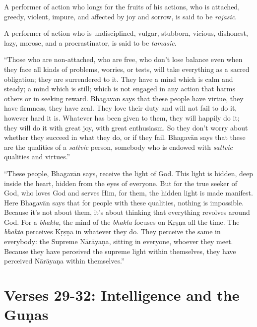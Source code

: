 {A performer of action who longs for the fruits of his actions, who is attached, greedy, violent, impure, and affected by joy and sorrow, is said to be \textit{rajasic}.}

{A performer of action who is undisciplined, vulgar, stubborn, vicious, dishonest, lazy, morose, and a procrastinator, is said to be \textit{tamasic}.}

\enquote{Those who are non-attached, who are free, who don’t lose balance even when they face all kinds of problems, worries, or tests, will take everything as a sacred obligation; they are surrendered to it. They have a mind which is calm and steady; a mind which is still; which is not engaged in any action that harms others or in seeking reward. Bhagavān says that these people have virtue, they have firmness, they have zeal. They love their duty and will not fail to do it, however hard it is. Whatever has been given to them, they will happily do it; they will do it with great joy, with great enthusiasm. So they don’t worry about whether they succeed in what they do, or if they fail. Bhagavān says that these are the qualities of a \textit{sattvic} person, somebody who is endowed with \textit{sattvic} qualities and virtues.}

\enquote{These people, Bhagavān says, receive the light of God. This light is hidden, deep inside the heart, hidden from the eyes of everyone. But for the true seeker of God, who loves God and serves Him, for them, the hidden light is made manifest. Here Bhagavān says that for people with these qualities, nothing is impossible. Because it’s not about them, it’s about thinking that everything revolves around God. For a \textit{bhakta}, the mind of the \textit{bhakta} focuses on Kṛṣṇa all the time. The \textit{bhakta} perceives Kṛṣṇa in whatever they do. They perceive the same in everybody: the Supreme Nārāyaṇa, sitting in everyone, whoever they meet. Because they have perceived the supreme light within themselves, they have perceived Nārāyaṇa within themselves.}

\newpage

\section{Verses 29-32: Intelligence and the Guṇas}\label{sec-verses-29-32-intelligence-and-the-gunas}

